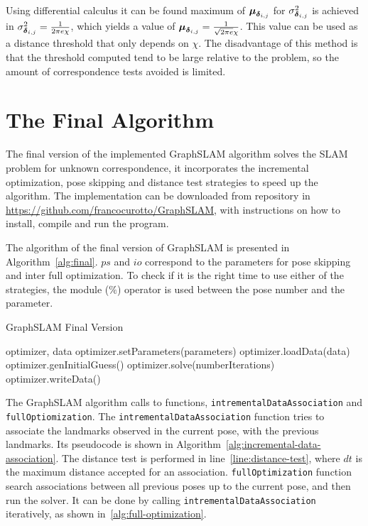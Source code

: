 Using differential calculus it can be found maximum of $\boldsymbol{\mu}_{\boldsymbol{\delta}_{i,j}}$ for $\sigma_{\boldsymbol{\delta}_{i,j}}^2$ is achieved in $\sigma_{\boldsymbol{\delta}_{i,j}}^2 = \frac{1}{2\pi e\chi}$, which yields a value of $\boldsymbol{\mu}_{\boldsymbol{\delta}_{i,j}} = \frac{1}{\sqrt{2\pi e}\chi}$.  
This value can be used as a  distance threshold that only depends on $\chi$. The disadvantage of this method is that the threshold computed tend to be large relative to the problem, so the amount of correspondence tests avoided is limited.

\section{The Final Algorithm}

The final version of the implemented GraphSLAM algorithm solves the SLAM problem for unknown correspondence, it incorporates the incremental optimization, pose skipping and  distance test strategies to speed up the algorithm. The implementation can be downloaded from repository in \url{https://github.com/francocurotto/GraphSLAM}, with instructions on how to install, compile and run the program.

The algorithm of the final version of GraphSLAM is presented in Algorithm~\ref{alg:final}. $ps$ and $io$ correspond to the parameters for pose skipping and inter full optimization. To check if it is the right time to use either of the strategies, the module ($\%$) operator is used between the pose number and the parameter. 

\begin{algorithm}[htbp!]
    \caption{GraphSLAM Final Version}
    \label{alg:final}
    \begin{algorithmic}[1]
        \Require optimizer, data
        \State optimizer.setParameters(parameters)
        \State optimizer.loadData(data)
        \State optimizer.genInitialGuess()
        \State
        \State {}
        \State optimizer.solve(numberIterations)
        \EndIf
        \State {}
        \EndIf
        \EndFor
        \State
        \State optimizer.writeData()
    \end{algorithmic}
\end{algorithm}

The GraphSLAM algorithm calls to functions, \texttt{intremental\-Data\-Association} and \texttt{full\-Optiomization}. The \texttt{intrementalDataAssociation} function tries to associate the landmarks observed in the current pose, with the previous landmarks. Its pseudocode is shown in Algorithm~\ref{alg:incremental-data-association}. The distance test is performed in line~\ref{line:distance-test}, where $dt$ is the maximum distance accepted for an association. \texttt{full\-Optimization} function search associations between all previous poses up to the current pose, and then run the solver. It can be done by calling \texttt{intremental\-Data\-Association} iteratively, as shown in~\ref{alg:full-optimization}.

